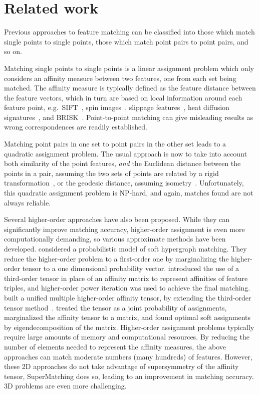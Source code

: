 \section{Related work}
\label{sec:related}

Previous approaches to feature matching can be classified into those which match single points to single points, those which match  point pairs to point pairs, and so on.

Matching single points to single points is a linear assignment problem which only considers an affinity measure between two features, one from each set being matched.
The affinity measure is typically defined as the feature distance between the feature vectors, which in turn are based on local information around each feature point,
e.g.\ SIFT~\cite{Lowe04}, spin images~\cite{Johnson99}, slippage features~\cite{Bokeloh08}, heat diffusion signatures~\cite{Sun09}, and BRISK~\cite{Leutenegger11}.
Point-to-point matching can give misleading results as wrong correspondences are readily established.

Matching point pairs  in one set to point pairs in the other set leads to a quadratic assignment problem.
The usual approach is now to take into account both similarity of the point features, \emph{and} the Euclidean distance between the points in a pair,
assuming the two sets of points are related by a rigid transformation~\cite{Leordeanu05,Cour06}, or the geodesic distance, assuming isometry~\cite{li08,Tevs09,Ovsjanikov10,Tevs11,SahilliogluY11,Windheuser11}.
Unfortunately, this quadratic assignment problem is NP-hard, and again, matches found are not always reliable.

Several higher-order approaches have also been proposed.
While they can significantly improve matching accuracy,
higher-order assignment  is even more computationally demanding, so various approximate methods have been developed.
\cite{Zass08} considered a probabilistic model of soft hypergraph matching.
They reduce the higher-order problem to a first-order one by marginalizing the higher-order tensor to a one dimensional probability vector.
\cite{Duchenne09} introduced the use of a third-order tensor in place of an affinity matrix to represent affinities of feature triples,
and higher-order power iteration was used to achieve the final matching.
\cite{Aiping10} built a unified multiple higher-order affinity tensor, by extending the third-order tensor method~\cite{Duchenne09}.
\cite{Chertok10} treated the tensor as a joint probability of assignments, marginalized the affinity tensor to a matrix,
and found optimal soft assignments by eigendecomposition of the matrix.
Higher-order assignment problems typically require large amounts of memory and computational resources. By reducing the number of elements needed to represent the affinity measures, the above approaches can match moderate numbers (many hundreds) of features. However, these 2D approaches do not take advantage of supersymmetry of the affinity tensor, SuperMatching does so, leading to an improvement in matching accuracy.
3D problems are even more challenging.

